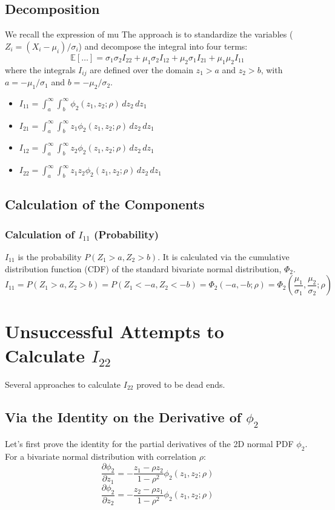 \documentclass[a4paper]{article}
\newcommand{\E}{\mathbb{E}}
\newcommand{\dd}{\,d}
\begin{document}
\subsection{Decomposition}
We recall the expression of mu
The approach is to standardize the variables ($Z_i = (X_i - \mu_i)/\sigma_i$) and decompose the integral into four terms:
\[
\E[\dots] = \sigma_1\sigma_2 I_{22} + \mu_1\sigma_2 I_{12} + \mu_2\sigma_1 I_{21} + \mu_1\mu_2 I_{11}
\]
where the integrals $I_{ij}$ are defined over the domain $z_1 > a$ and $z_2 > b$, with $a = -\mu_1/\sigma_1$ and $b = -\mu_2/\sigma_2$.
\begin{itemize}
    \item $I_{11} = \int_a^\infty \int_b^\infty \phi_2(z_1, z_2; \rho) \dd z_2 \dd z_1$
    \item $I_{21} = \int_a^\infty \int_b^\infty z_1 \phi_2(z_1, z_2; \rho) \dd z_2 \dd z_1$
    \item $I_{12} = \int_a^\infty \int_b^\infty z_2 \phi_2(z_1, z_2; \rho) \dd z_2 \dd z_1$
    \item $I_{22} = \int_a^\infty \int_b^\infty z_1 z_2 \phi_2(z_1, z_2; \rho) \dd z_2 \dd z_1$
\end{itemize}

\subsection{Calculation of the Components}

\subsubsection*{Calculation of $I_{11}$ (Probability)}
$I_{11}$ is the probability $P(Z_1 > a, Z_2 > b)$. It is calculated via the cumulative distribution function (CDF) of the standard bivariate normal distribution, $\Phi_2$.
\[
I_{11} = P(Z_1 > a, Z_2 > b) = P(Z_1 < -a, Z_2 < -b) = \Phi_2(-a, -b; \rho) = \Phi_2\left(\frac{\mu_1}{\sigma_1}, \frac{\mu_2}{\sigma_2}; \rho\right)
\]







\newpage
\section{Unsuccessful Attempts to Calculate $I_{22}$}
Several approaches to calculate $I_{22}$ proved to be dead ends.
\subsection{Via the Identity on the Derivative of $\phi_2$}
Let's first prove the identity for the partial derivatives of the 2D normal PDF $\phi_2$. For a bivariate normal distribution with correlation $\rho$:
\[
\frac{\partial \phi_2}{\partial z_1} = -\frac{z_1 - \rho z_2}{1-\rho^2} \phi_2(z_1, z_2; \rho)
\]
\[
\frac{\partial \phi_2}{\partial z_2} = -\frac{z_2 - \rho z_1}{1-\rho^2} \phi_2(z_1, z_2; \rho)
\]
\end{document}

